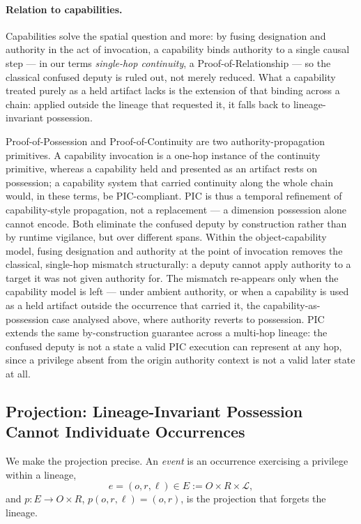 \documentclass[11pt]{article}
\begin{document}
\paragraph{Relation to capabilities.}
Capabilities solve the spatial question and more: by fusing designation and
authority in the act of invocation, a capability binds authority to a single
causal step --- in our terms \emph{single-hop continuity}, a
Proof-of-Relationship --- so the classical confused deputy is ruled out, not
merely reduced. What a capability treated purely as a held artifact lacks is the
extension of that binding across a chain: applied outside the lineage that
requested it, it falls back to lineage-invariant possession.

Proof-of-Possession and Proof-of-Continuity are two authority-propagation
primitives. A capability invocation is a one-hop instance of the continuity
primitive, whereas a capability held and presented as an artifact rests on
possession; a capability system that carried continuity along the whole chain
would, in these terms, be PIC-compliant. PIC is thus a temporal refinement of
capability-style propagation, not a replacement --- a dimension possession alone
cannot encode. Both eliminate the confused deputy by construction rather than by
runtime vigilance, but over different spans. Within the object-capability model,
fusing designation and authority at the point of invocation removes the classical,
single-hop mismatch structurally: a deputy cannot apply authority to a target it
was not given authority for. The mismatch re-appears only when the capability
model is left --- under ambient authority, or when a capability is used as a held
artifact outside the occurrence that carried it, the capability-as-possession case
analysed above, where authority reverts to possession. PIC extends the same
by-construction guarantee across a multi-hop lineage: the confused deputy is not a
state a valid PIC execution can represent at any hop, since a privilege absent
from the origin authority context is not a valid later state at all.

\subsection{Projection: Lineage-Invariant Possession Cannot Individuate Occurrences}
\label{sec:impossibility}

We make the projection precise. An \emph{event} is an occurrence exercising a
privilege within a lineage,
\[
e = (o, r, \ell) \in E := O \times R \times \mathcal{L},
\]
and $p : E \to O \times R$, $p(o,r,\ell) = (o,r)$, is the projection that forgets
the lineage.
\end{document}
